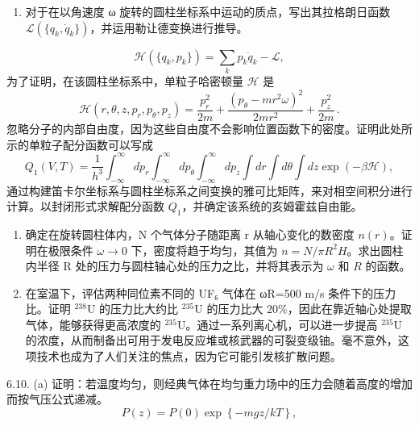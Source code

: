 \begin{enumerate}
\def\labelenumi{(\alph{enumi})}
\item
  对于在以角速度 ω 旋转的圆柱坐标系中运动的质点，写出其拉格朗日函数 \(\mathcal{L}(\{q_{k},\dot{q}_{k}\})\)，并运用勒让德变换进行推导。
\end{enumerate}
\begin{equation}\tag{6.6.23}\label{eq:6.6.23}
\mathcal { H } ( \{ q _ { k } , p _ { k } \} ) = \sum _ { k } p _ { k } \dot { q } _ { k } - \mathcal { L } ,
\end{equation}
为了证明，在该圆柱坐标系中，单粒子哈密顿量 \(\mathcal{H}\) 是
\begin{equation}\tag{6.6.24}\label{eq:6.6.24}
\mathcal { H } ( r , \theta , z , p _ { r } , p _ { \theta } , p _ { z } ) = \frac { p _ { r } ^{2} } { 2 m } + \frac { ( p _ { \theta } - m r ^{2} \omega ) ^{2} } { 2 m r ^{2} } + \frac { p _ { z } ^{2} } { 2 m } \, .
\end{equation}
忽略分子的内部自由度，因为这些自由度不会影响位置函数下的密度。证明此处所示的单粒子配分函数可以写成
\begin{equation}\tag{6.6.25}\label{eq:6.6.25}
Q _ { 1 } ( V , T ) = \frac { 1 } { h ^{3} } \int _ { - \infty } ^{\infty} d p _ { r } \int _ { - \infty } ^{\infty} d p _ { \theta } \int _ { - \infty } ^{\infty} d p _ { z } \int d r \int d \theta \int d z \exp \left( - \beta \mathcal { H } \right) ,
\end{equation}
通过构建笛卡尔坐标系与圆柱坐标系之间变换的雅可比矩阵，来对相空间积分进行计算。以封闭形式求解配分函数 \(Q_1\)，并确定该系统的亥姆霍兹自由能。
\begin{enumerate}
\def\labelenumi{(\alph{enumi})}
\setcounter{enumi}{1}
\item
  确定在旋转圆柱体内，N 个气体分子随距离 r 从轴心变化的数密度 \(n(r)\)。证明在极限条件 \(\omega \to 0\) 下，密度将趋于均匀，其值为 \(n = N/\pi R^2 H\)。求出圆柱内半径 R 处的压力与圆柱轴心处的压力之比，并将其表示为 \(\omega\) 和 \(R\) 的函数。
\item
  在室温下，评估两种同位素不同的 UF₆ 气体在 ωR=500 m/s 条件下的压力比。证明 \(^{238}\)U 的压力比大约比 \(^{235}\)U 的压力比大 20\%，因此在靠近轴心处提取气体，能够获得更高浓度的 \(^{235}\)U。通过一系列离心机，可以进一步提高 \(^{235}\)U 的浓度，从而制备出可用于发电反应堆或核武器的可裂变级铀。毫不意外，这项技术也成为了人们关注的焦点，因为它可能引发核扩散问题。
\end{enumerate}
6.10. (a) 证明：若温度均匀，则经典气体在均匀重力场中的压力会随着高度的增加而按气压公式递减。
\begin{equation}\tag{6.6.26}\label{eq:6.6.26}
P ( z ) = P ( 0 ) \exp \left\{ - m g z / k T \right\} ,
\end{equation}
